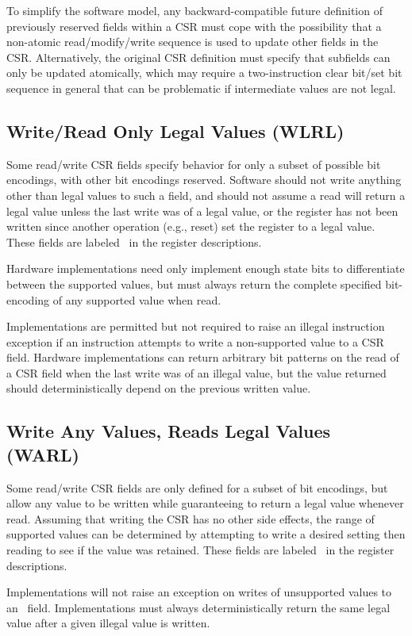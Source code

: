 \begin{commentary}
To simplify the software model, any backward-compatible future
definition of previously reserved fields within a CSR must cope with
the possibility that a non-atomic read/modify/write sequence is used
to update other fields in the CSR.  Alternatively, the original CSR
definition must specify that subfields can only be updated atomically,
which may require a two-instruction clear bit/set bit sequence in
general that can be problematic if intermediate values are not legal.
\end{commentary}

\subsection*{Write/Read Only Legal Values (WLRL)}

Some read/write CSR fields specify behavior for only a subset of
possible bit encodings, with other bit encodings reserved.  Software
should not write anything other than legal values to such a field, and
should not assume a read will return a legal value unless the last
write was of a legal value, or the register has not been written since
another operation (e.g., reset) set the register to a legal value.
These fields are labeled \wlrl\ in the register descriptions.
 
\begin{commentary}
Hardware implementations need only implement enough state bits to
differentiate between the supported values, but must always return the
complete specified bit-encoding of any supported value when read.
\end{commentary}

Implementations are permitted but not required to raise an illegal
instruction exception if an instruction attempts to write a
non-supported value to a CSR field.  Hardware implementations can
return arbitrary bit patterns on the read of a CSR field when the last
write was of an illegal value, but the value returned should
deterministically depend on the previous written value.

\subsection*{Write Any Values, Reads Legal Values (WARL)}

Some read/write CSR fields are only defined for a subset of bit
encodings, but allow any value to be written while guaranteeing to
return a legal value whenever read.  Assuming that writing the CSR has
no other side effects, the range of supported values can be determined
by attempting to write a desired setting then reading to see if the
value was retained.  These fields are labeled \warl\ in the register
descriptions.

Implementations will not raise an exception on writes of unsupported
values to an \warl\ field.  Implementations must always
deterministically return the same legal value after a given illegal
value is written.

